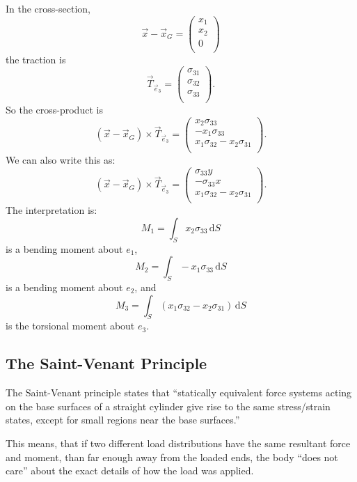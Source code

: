 In the cross-section,
\begin{equation*}
  \Vec{x}- \Vec{x}_G = \begin{pmatrix}
    x_1\\
  x_2\\
  0\\
  \end{pmatrix}
\end{equation*}
the traction is
\begin{equation*}
  \Vec{T}_{\Vec{e}_3} = \begin{pmatrix}
    \sigma_{31}\\
  \sigma_{32}\\
  \sigma_{33}\\
  \end{pmatrix}
.\end{equation*}
So the cross-product is
\begin{equation*}
  \left( \Vec{x} - \Vec{x}_G  \right) \times \Vec{T}_{\Vec{e}_3} = \begin{pmatrix}
    x_2 \sigma_{33}\\
  - x_1 \sigma_{33}\\
  x_1 \sigma_{32} - x_2 \sigma_{31}\\
  \end{pmatrix}
.\end{equation*}
We can also write this as:
\begin{equation*}
    \left( \Vec{x} - \Vec{x}_G  \right) \times \Vec{T}_{\Vec{e}_3} = \begin{pmatrix}
      \sigma_{33}y\\
    - \sigma_{33} x\\
    x_1 \sigma_{32} - x_2 \sigma_{31}\\
    \end{pmatrix}
.\end{equation*}
The interpretation is:
\begin{equation*}
  M_1 = \int_S x_2 \sigma_{33} \, \mathrm{d}S
\end{equation*}
is a bending moment about $e_1$,
\begin{equation*}
  M_2 = \int_S - x_1 \sigma_{33} \, \mathrm{d}S
\end{equation*}
is a bending moment about $e_2$, and 
\begin{equation*}
  M_3 = \int_S \left( x_1 \sigma_{32} - x_2 \sigma_{31} \right) \, \mathrm{d}S
\end{equation*}
is the torsional moment about $e_3$.

\subsection{The Saint-Venant Principle}
The Saint-Venant principle states that ``statically equivalent force systems acting on the base surfaces of a straight cylinder give rise to the same stress/strain states, except for small regions near the base surfaces.''

This means, that if two different load distributions have the same resultant force and moment, than far enough away from the loaded ends, the body ``does not care'' about the exact details of how the load was applied.


